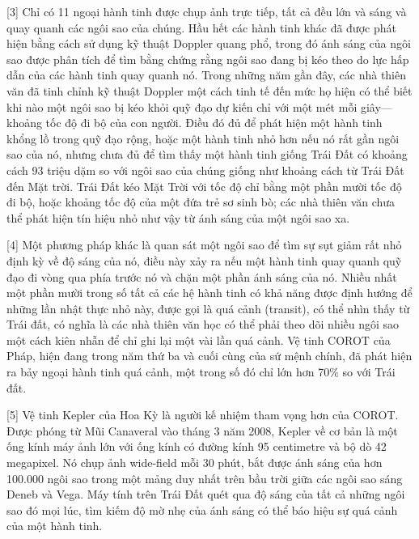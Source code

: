 \documentclass[12pt,a4paper,twoside]{article}
\newenvironment{readingpassage}[1][]{%
    \begin{tcolorbox}[enhanced, colback=grayLight, colframe=secondaryBlue,
        coltitle=textDark, fonttitle=\bfseries, title={#1},
        rounded corners, arc=3mm, boxrule=1pt,
        left=15pt, right=15pt, top=10pt, bottom=10pt,
        breakable, before skip=10pt, after skip=10pt, drop fuzzy shadow]
    \setstretch{1.3}
}{\end{tcolorbox}}
\begin{document}
\begin{readingpassage}[]
[3] Chỉ có 11 ngoại hành tinh được chụp ảnh trực tiếp, tất cả đều lớn và sáng và quay quanh các ngôi sao của chúng. Hầu hết các hành tinh khác đã được phát hiện bằng cách sử dụng kỹ thuật Doppler quang phổ, trong đó ánh sáng của ngôi sao được phân tích để tìm bằng chứng rằng ngôi sao đang bị kéo theo do lực hấp dẫn của các hành tinh quay quanh nó. Trong những năm gần đây, các nhà thiên văn đã tinh chỉnh kỹ thuật Doppler một cách tinh tế đến mức họ hiện có thể biết khi nào một ngôi sao bị kéo khỏi quỹ đạo dự kiến chỉ với một mét mỗi giây—khoảng tốc độ đi bộ của con người. Điều đó đủ để phát hiện một hành tinh khổng lồ trong quỹ đạo rộng, hoặc một hành tinh nhỏ hơn nếu nó rất gần ngôi sao của nó, nhưng chưa đủ để tìm thấy một hành tinh giống Trái Đất có khoảng cách 93 triệu dặm so với ngôi sao của chúng giống như khoảng cách từ Trái Đất đến Mặt trời. Trái Đất kéo Mặt Trời với tốc độ chỉ bằng một phần mười tốc độ đi bộ, hoặc khoảng tốc độ của một đứa trẻ sơ sinh bò; các nhà thiên văn chưa thể phát hiện tín hiệu nhỏ như vậy từ ánh sáng của một ngôi sao xa.

[4] Một phương pháp khác là quan sát một ngôi sao để tìm sự sụt giảm rất nhỏ định kỳ về độ sáng của nó, điều này xảy ra nếu một hành tinh quay quanh quỹ đạo đi vòng qua phía trước nó và chặn một phần ánh sáng của nó. Nhiều nhất một phần mười trong số tất cả các hệ hành tinh có khả năng được định hướng để những lần nhật thực nhỏ này, được gọi là quá cảnh (transit), có thể nhìn thấy từ Trái đất, có nghĩa là các nhà thiên văn học có thể phải theo dõi nhiều ngôi sao một cách kiên nhẫn để chỉ ghi lại một vài lần quá cảnh. Vệ tinh COROT của Pháp, hiện đang trong năm thứ ba và cuối cùng của sứ mệnh chính, đã phát hiện ra bảy ngoại hành tinh quá cảnh, một trong số đó chỉ lớn hơn 70\% so với Trái đất.

[5] Vệ tinh Kepler của Hoa Kỳ là người kế nhiệm tham vọng hơn của COROT. Được phóng từ Mũi Canaveral vào tháng 3 năm 2008, Kepler về cơ bản là một ống kính máy ảnh lớn với ống kính có đường kính 95 centimetre và bộ dò 42 megapixel. Nó chụp ảnh wide-field mỗi 30 phút, bắt được ánh sáng của hơn 100.000 ngôi sao trong một mảng duy nhất trên bầu trời giữa các ngôi sao sáng Deneb và Vega. Máy tính trên Trái Đất quét qua độ sáng của tất cả những ngôi sao đó mọi lúc, tìm kiếm độ mờ nhẹ của ánh sáng có thể báo hiệu sự quá cảnh của một hành tinh.


\end{readingpassage}
\end{document}
